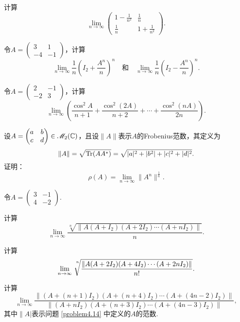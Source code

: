 \begin{problem}
  计算
  \[
    \lim_{n\to\infty} \begin{pmatrix}
      1 - \frac1{n^2} & \frac1n \\
      \frac1n & 1 + \frac1{n^2}
    \end{pmatrix}.
  \]
\end{problem}

\begin{problem}
  \cite{29} 令$A=\begin{pmatrix}
    3 & 1 \\
    -4 & -1
  \end{pmatrix}$，计算
  \[
    \lim_{n\to\infty}\frac1n\left( I_2 + \frac{A^n}n\right)^n \quad \text{和}\quad
    \lim_{n\to\infty}\frac1n\left( I_2 - \frac{A^n}n\right)^n.
  \]
\end{problem}

\begin{problem}
  令$A=\begin{pmatrix}
    2 & -1 \\
    -2 & 3
  \end{pmatrix}$，计算
  \[
    \lim_{n\to\infty} \left(
      \frac{\cos^2A}{n+1} + \frac{\cos^2(2A)}{n+2} + \cdots + \frac{\cos^2(nA)}{2n}
    \right).
  \]
\end{problem}

\begin{mybox}
  \begin{problem}[Gelfand谱半径公式，1941.]

    设$A=\begin{pmatrix}
      a & b \\
      c & d
    \end{pmatrix}\in\mathscr M_2(\mathbb C)$，且设$\|A\|$表示$A$的{\kaishu Frobenius}范数，其定义为
    \[
      \|A\| = \sqrt{\operatorname{Tr}(AA^\ast)} = \sqrt{|a|^2+|b^2|+|c|^2+|d|^2}.
    \]
    证明：
    \[
      \rho(A) = \lim_{n\to\infty}\|A^n\|^{\frac1n}.
    \]
  \end{problem}
\end{mybox}

\begin{problem}
  令$A=\begin{pmatrix}
    3 & -1 \\
    4 & -2
  \end{pmatrix}$.
  \begin{enum}
    \item 计算
    \[
      \lim_{n\to\infty} \frac{\sqrt[n]{\|
        A(A+I_2)(A+2I_2)\cdots(A+nI_2)
      \|}}n.
    \]
    \item 计算
    \[
      \lim_{n\to\infty} \sqrt[\uproot{10}\leftroot{-3}n]{\frac{\|
        A(A+2I_2)(A+4I_2)\cdots(A+2nI_2)
      \|}{n!}}.
    \]
    \item 计算
    \[
      \lim_{n\to\infty} \frac{\|
      (A+(n+1)I_2)(A+(n+4)I_2)\cdots (A+(4n-2)I_2)
      \|}{\|
      (A+nI_2)(A+(n+3)I_2)\cdots (A+(4n-3)I_2)
      \|},
    \]
    其中$\|A|$表示问题 \ref{problem4.14} 中定义的$A$的范数.
  \end{enum}
\end{problem}

